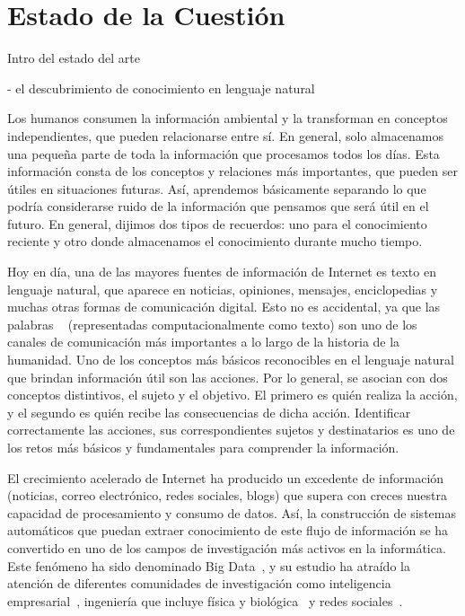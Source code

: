 \chapter{Estado de la Cuesti\'on}\label{Chap:SOTA}

Intro del estado del arte

- el descubrimiento de conocimiento en lenguaje natural

Los humanos consumen la información ambiental y la transforman en conceptos independientes, que pueden relacionarse entre sí.
En general, solo almacenamos una pequeña parte de toda la información que procesamos todos los días.
Esta información consta de los conceptos y relaciones más importantes, que pueden ser útiles en situaciones futuras.
Así, aprendemos básicamente separando lo que podría considerarse ruido de la información que pensamos que será útil en el futuro.
En general, dijimos dos tipos de recuerdos: uno para el conocimiento reciente y otro donde almacenamos el conocimiento durante mucho tiempo.

Hoy en día, una de las mayores fuentes de información de Internet
es texto en lenguaje natural, que aparece en noticias, opiniones, mensajes, enciclopedias y muchas otras formas de comunicación digital.
Esto no es accidental, ya que las palabras ~ (representadas computacionalmente como texto) son uno de los canales de comunicación más importantes a lo largo de la historia de la humanidad.
Uno de los conceptos más básicos reconocibles en el lenguaje natural que brindan información útil son las acciones. Por lo general, se asocian con dos conceptos distintivos, el sujeto y el objetivo. El primero es quién realiza la acción, y el segundo es quién recibe las consecuencias de dicha acción.
Identificar correctamente las acciones, sus correspondientes sujetos y destinatarios es uno de los retos más básicos y fundamentales para comprender la información.

El crecimiento acelerado de Internet ha producido un excedente de información (noticias, correo electrónico, redes sociales, blogs) que supera con creces nuestra capacidad de procesamiento y consumo de datos.
Así, la construcción de sistemas automáticos que puedan extraer conocimiento de este flujo de información se ha convertido en uno de los campos de investigación más activos en la informática. Este fenómeno ha sido
denominado Big Data~\cite{bigdata}, y su estudio ha atraído la atención de diferentes comunidades de investigación como inteligencia empresarial~\cite{chen2012business}, ingeniería que incluye física y biológica~\cite{wu2014data} y redes sociales~\cite{shah2015big}.


